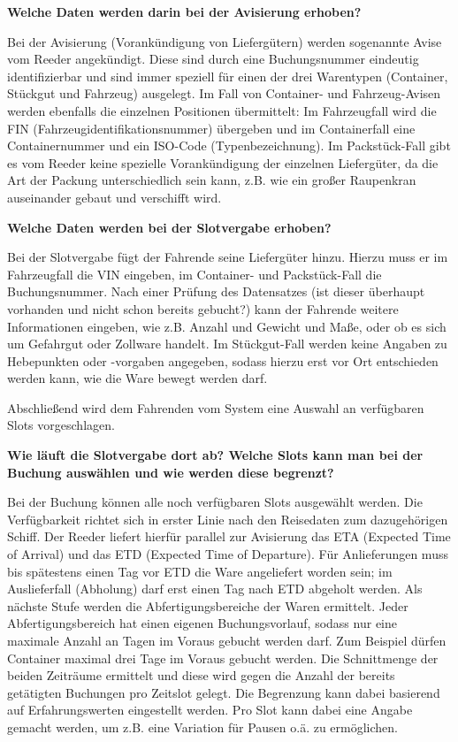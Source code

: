 \textbf{Welche Daten werden darin bei der Avisierung erhoben?}

Bei der Avisierung (Vorankündigung von Liefergütern) werden sogenannte Avise vom Reeder angekündigt. Diese sind durch eine Buchungsnummer eindeutig identifizierbar und sind immer speziell für einen der drei Warentypen (Container, Stückgut und Fahrzeug) ausgelegt. Im Fall von Container- und Fahrzeug-Avisen werden ebenfalls die einzelnen Positionen übermittelt: Im Fahrzeugfall wird die FIN (Fahrzeugidentifikationsnummer) übergeben und im Containerfall eine Containernummer und ein ISO-Code (Typenbezeichnung). Im Packstück-Fall gibt es vom Reeder keine spezielle Vorankündigung der einzelnen Liefergüter, da die Art der Packung unterschiedlich sein kann, z.B. wie ein großer Raupenkran auseinander gebaut und verschifft wird.

\textbf{Welche Daten werden bei der Slotvergabe erhoben?}

Bei der Slotvergabe fügt der Fahrende seine Liefergüter hinzu. Hierzu muss er im Fahrzeugfall die VIN eingeben, im Container- und Packstück-Fall die Buchungsnummer. Nach einer Prüfung des Datensatzes (ist dieser überhaupt vorhanden und nicht schon bereits gebucht?) kann der Fahrende weitere Informationen eingeben, wie z.B. Anzahl und Gewicht und Maße, oder ob es sich um Gefahrgut oder Zollware handelt. Im Stückgut-Fall werden keine Angaben zu Hebepunkten oder -vorgaben angegeben, sodass hierzu erst vor Ort entschieden werden kann, wie die Ware bewegt werden darf.

Abschließend wird dem Fahrenden vom System eine Auswahl an verfügbaren Slots vorgeschlagen.

\textbf{Wie läuft die Slotvergabe dort ab? Welche Slots kann man bei der Buchung auswählen und wie werden diese begrenzt?}

Bei der Buchung können alle noch verfügbaren Slots ausgewählt werden. Die Verfügbarkeit richtet sich in erster Linie nach den Reisedaten zum dazugehörigen Schiff. Der Reeder liefert hierfür parallel zur Avisierung das ETA (Expected Time of Arrival) und das ETD (Expected Time of Departure). Für Anlieferungen muss bis spätestens einen Tag vor ETD die Ware angeliefert worden sein; im Auslieferfall (Abholung) darf erst einen Tag nach ETD abgeholt werden. Als nächste Stufe werden die Abfertigungsbereiche der Waren ermittelt. Jeder Abfertigungsbereich hat einen eigenen Buchungsvorlauf, sodass nur eine maximale Anzahl an Tagen im Voraus gebucht werden darf. Zum Beispiel dürfen Container maximal drei Tage im Voraus gebucht werden. Die Schnittmenge der beiden Zeiträume ermittelt und diese wird gegen die Anzahl der bereits getätigten Buchungen pro Zeitslot gelegt. Die Begrenzung kann dabei basierend auf Erfahrungswerten eingestellt werden. Pro Slot kann dabei eine Angabe gemacht werden, um z.B. eine Variation für Pausen o.ä. zu ermöglichen.


